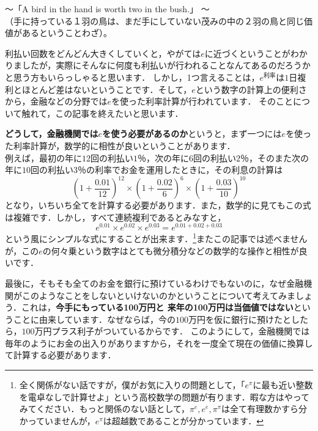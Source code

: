 \begin{flushright}
〜「A bird in the hand is worth two in the bush.」 〜\\
（手に持っている１羽の鳥は、まだ手にしていない茂みの中の２羽の鳥と同じ価値があるということわざ）。
\end{flushright}

利払い回数をどんどん大きくしていくと，やがては$e$に近づくということがわかりましたが，実際にそんなに何度も利払いが行われることなんてあるのだろうかと思う方もいらっしゃると思います．
しかし，1つ言えることは，$e^{利率}$は$1$日複利とほとんど差はないということです．そして，$e$という数字の計算上の便利さから，金融などの分野では$e$を使った利率計算が行われています．
そのことについて触れて，この記事を終えたいと思います．

\textbf{どうして，金融機関では$e$を使う必要があるのか}というと，まず一つには$e$を使った利率計算が，数学的に相性が良いということがあります．\\
例えば，最初の年に$12$回の利払い$1$％，次の年に$6$回の利払い$2$％，そのまた次の年に$10$回の利払い$3$％の利率でお金を運用したときに，その利息の計算は
\[
\left(1+\frac{0.01}{12}\right)^{12} \times \left(1+\frac{0.02}{6}\right)^6 \times \left(1+\frac{0.03}{10}\right)^{10}
\]
となり，いちいち全てを計算する必要があります．また，数学的に見てもこの式は複雑です．しかし，すべて連続複利であるとみなすと，
\[
e^{0.01} \times e^{0.02} \times e^{0.03} = e^{0.01+0.02+0.03}
\]
という風にシンプルな式にすることが出来ます．\footnote{全く関係がない話ですが，僕がお気に入りの問題として，「$e^\pi$に最も近い整数を電卓なしで計算せよ」という高校数学の問題が有ります．暇な方はやってみてください．もっと関係のない話として，$\pi^e,e^e,\pi^\pi$は全て有理数かすら分かっていませんが，$e^\pi$は超越数であることが分かっています．}またこの記事では述べませんが，この$e$の何々乗という数字はとても微分積分などの数学的な操作と相性が良いです．

最後に，そもそも全てのお金を銀行に預けているわけでもないのに，なぜ金融機関がこのようなことをしないといけないのかということについて考えてみましょう．これは，\textbf{今手にもっている100万円と 来年の100万円は当価値ではない}ということに由来しています．なぜならば，今の$100$万円を仮に銀行に預けたとしたら，$100$万円プラス利子がついているからです．
このようにして，金融機関では毎年のようにお金の出入りがありますから，それを一度全て現在の価値に換算して計算する必要があります．

